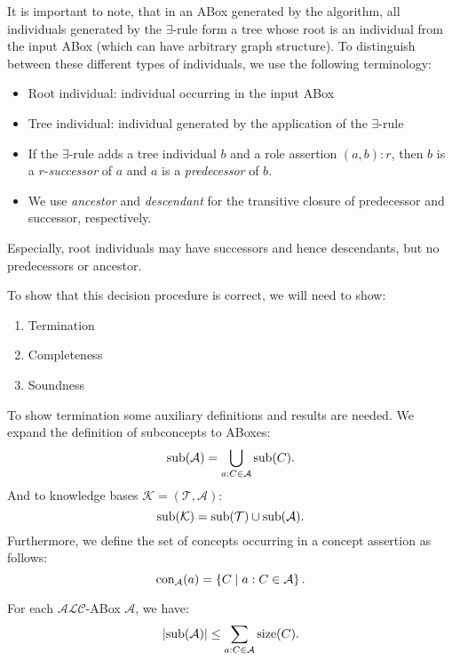 \begin{terminology}
	It is important to note, that in an ABox generated by the algorithm,
	all individuals generated by the $\exists$-rule form a tree
	whose root is an individual from the input ABox (which can have arbitrary graph structure).
	To distinguish between these different types of individuals, we use the following terminology:
	\begin{itemize}
		\item Root individual: individual occurring in the input ABox
		\item Tree individual: individual generated by the application of the $\exists$-rule
		\item If the $\exists$-rule adds a tree individual $b$ and a role assertion $(a,b):r$,
			then $b$ is a $r$-\textit{successor} of  $a$ and $a$ is a \textit{predecessor} of $b$.
		\item We use \textit{ancestor} and \textit{descendant}
			for the transitive closure of predecessor and successor, respectively.
	\end{itemize}
	Especially, root individuals may have successors and hence descendants, but no predecessors or ancestor.
\end{terminology}

\newpage
To show that this decision procedure is correct, we will need to show:
\begin{enumerate}
	\item Termination
	\item Completeness
	\item Soundness
\end{enumerate}

To show termination some auxiliary definitions and results are needed.
We expand the definition of subconcepts to ABoxes:
\[
	\operatorname{\text{sub}}(\mathcal{A}) = \bigcup_{a:C \in \mathcal{A}} \operatorname{\text{sub}}(C)
.\]
And to knowledge bases $\mathcal{K} = (\mathcal{T}, \mathcal{A})$:
\[
	\operatorname{\text{sub}}(\mathcal{K}) = \operatorname{\text{sub}}(\mathcal{T}) \cup \operatorname{\text{sub}}(\mathcal{A})
.\]
Furthermore, we define the set of concepts occurring in a concept assertion as follows:
\[
	\operatorname{\text{con}}_{\mathcal{A}}(a) = \left\{ C \mid a : C \in \mathcal{A} \right\}
.\]

\begin{lemma}\label{lem:cardinality bound abox subconcepts}
	For each $\mathcal{ALC}$-ABox $\mathcal{A}$, we have:
	\[
		\lvert \operatorname{\text{sub}}(\mathcal{A}) \rvert \leq \sum_{a:C \in \mathcal{A}} \operatorname{\text{size}}(C) 
	.\]
\end{lemma}

